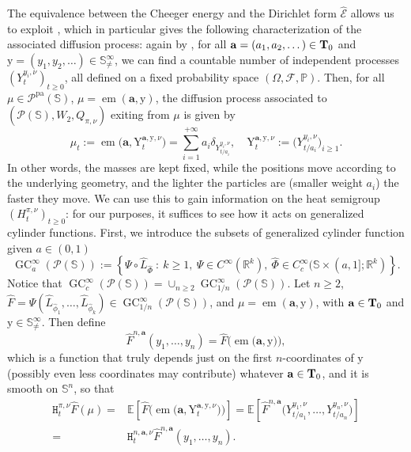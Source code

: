 \documentclass[10pt,leqno]{amsart}
\numberwithin{equation}{section}
\newcommand{\R}{\mathbb{R}}
\newcommand{\PP}{\mathcal{P}}
\newcommand{\PPpa}{\PP^{\operatorname{pa}}}
\newcommand{\ttH}{\mathtt{H}}
\newcommand{\Ss}{\mathbb{S}}
\begin{document}
    The equivalence between the Cheeger energy and the Dirichlet form $\widehat{\mathcal{E}}$ allows us to exploit \cite[Theorems 3.15 \& 3.24]{delloschiavo2024massive}, which in particular gives the following characterization of the associated diffusion process: again by \cite[Corollary 2.25]{delloschiavo2024massive}, for all $\mathbf{a} = (a_1,a_2, \dots ) \in \bold{T}_0$ and $\mathrm{y} = (y_1,y_2,\dots) \in \Ss^\infty_{\neq}$, we can find a countable number of independent processes $(Y^{y_i,\nu}_t)_{t\geq 0}$, all defined on a fixed probability space $(\Omega,\mathcal{F},\mathbb{P})$. Then, for all $\mu\in \PPpa(\Ss)$, $\mu = \operatorname{em}(\mathbf{a}, \mathrm{y})$, the diffusion process associated to $(\PP(\Ss),W_2,Q_{\pi,\nu})$ exiting from $\mu$ is given by
    \begin{equation}
        \mu_t := \operatorname{em}\big(\mathbf{a}, \mathrm{Y}^{\mathbf{a},\mathrm{y},\nu}_t\big) = \sum_{i=1}^{+\infty} a_i \delta_{Y_{t/a_i}^{y_i, \nu}}, \quad \mathrm{Y}^{\mathbf{a},\mathrm{y},\nu}_t := \big(Y_{t/a_i}^{y_i, \nu}\big)_{i\geq 1}.
    \end{equation}
    In other words, the masses are kept fixed, while the positions move according to the underlying geometry, and the lighter the particles are (smaller weight $a_i$) the faster they move. We can use this to gain information on the heat semigroup $(H^{\pi,\nu}_t)_{t\geq 0}$: for our purposes, it suffices to see how it acts on generalized cylinder functions. First, we introduce the subsets of generalized cylinder function given $a\in(0,1)$
    \[\operatorname{GC}_{a}^\infty(\PP(\Ss)) := \left\{\Psi\circ \hat{L}_{\hat{\Phi}} \ : \ k\geq1, \ \Psi \in C^\infty(\R^k), \ \hat{\Phi} \in C^\infty_c(\Ss\times(a,1];\R^k) \right\}.\]
    Notice that $\operatorname{GC}_c^\infty(\PP(\Ss)) = \cup_{n\geq 2} \operatorname{GC}_{1/n}^\infty(\PP(\Ss))$.
    Let $n\geq 2$, $\hat{F} = \Psi(\hat{L}_{\hat{\phi}_1},\dots, \hat{L}_{\hat{\phi}_k}) \in \operatorname{GC}_{1/n}^\infty (\PP(\Ss))$,
    and $\mu = \operatorname{em}(\mathbf{a},\mathrm{y})$, with $\mathbf{a} \in \bold{T}_0$ and $\mathrm{y} \in \Ss^\infty_{\neq}$. Then define 
    \[\hat{F}^{n,\mathbf{a}}(y_1,\dots,y_n) = \hat{F} \big(\operatorname{em}\big(\mathbf{a}, \mathrm{y}\big)\big),\]
    which is a function that truly depends just on the first $n$-coordinates of $\mathrm{y}$ (possibly even less coordinates may contribute) whatever $\mathbf{a}\in \bold{T}_0$, and it is smooth on $\Ss^n$, so that
    \begin{equation}\label{eq: heat semigroup on GC}
    \begin{aligned}
        \ttH^{\pi,\nu}_t \hat{F} (\mu) = &\mathbb{E}\left[\hat{F}\big(\operatorname{em}\big(\mathbf{a}, \mathrm{Y}^{\mathbf{a},\mathrm{y},\nu}_t\big)\big) \right] = \mathbb{E}\left[\hat{F}^{n,\mathbf{a}} \big(Y_{t/a_1}^{y_1, \nu},\dots,Y_{t/a_n}^{y_n, \nu}\big) \right] 
        \\
        = & \ttH^{n,\mathbf{a},\nu}_t \hat{F}^{n,\mathbf{a}}(y_1,\dots,y_n).
    \end{aligned}
    \end{equation}
\end{document}
